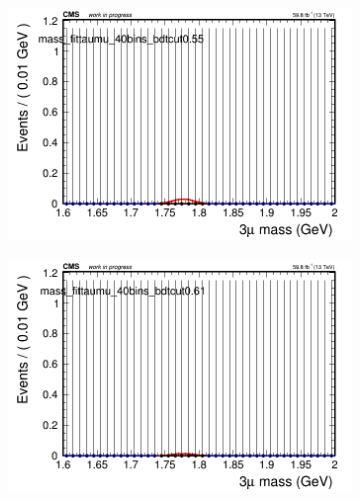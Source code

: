 \begin{figure}[H]
\begin{subfigure}{0.2\textwidth}
        \caption{}
    \end{subfigure}
    \begin{subfigure}{0.2\textwidth}
        \includegraphics[width=\textwidth]{unfixed_exp/plots/taumu/massfit_taumu_40bins_bdtcut0.55.png}
        \caption{}
    \end{subfigure}
    \begin{subfigure}{0.2\textwidth}
        \includegraphics[width=\textwidth]{unfixed_exp/plots/taumu/massfit_taumu_40bins_bdtcut0.61.png}
        \caption{}
    \end{subfigure}
    \begin{subfigure}{0.2\textwidth}

\end{subfigure}
\end{figure}
